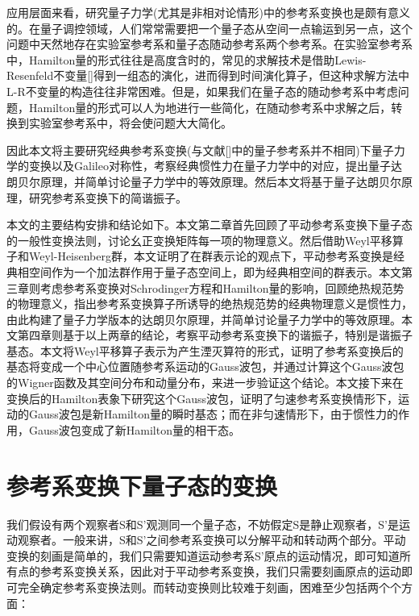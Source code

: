 \documentclass[a4paper]{article}
\begin{document}
        应用层面来看，研究量子力学(尤其是非相对论情形)中的参考系变换也是颇有意义的。在量子调控领域，人们常常需要把一个量子态从空间一点输运到另一点，这个问题中天然地存在实验室参考系和量子态随动参考系两个参考系。在实验室参考系中，Hamilton量的形式往往是高度含时的，常见的求解技术是借助Lewis-Resenfeld不变量[]得到一组态的演化，进而得到时间演化算子，但这种求解方法中L-R不变量的构造往往非常困难。但是，如果我们在量子态的随动参考系中考虑问题，Hamilton量的形式可以人为地进行一些简化，在随动参考系中求解之后，转换到实验室参考系中，将会使问题大大简化。

        因此本文将主要研究经典参考系变换(与文献[]中的量子参考系并不相同)下量子力学的变换以及Galileo对称性，考察经典惯性力在量子力学中的对应，提出量子达朗贝尔原理，并简单讨论量子力学中的等效原理。然后本文将基于量子达朗贝尔原理，研究参考系变换下的简谐振子。

        本文的主要结构安排和结论如下。本文第二章首先回顾了平动参考系变换下量子态的一般性变换法则，讨论幺正变换矩阵每一项的物理意义。然后借助Weyl平移算子和Weyl-Heisenberg群，本文证明了在群表示论的观点下，平动参考系变换是经典相空间作为一个加法群作用于量子态空间上，即为经典相空间的群表示。本文第三章则考虑参考系变换对Schrodinger方程和Hamilton量的影响，回顾绝热规范势的物理意义，指出参考系变换算子所诱导的绝热规范势的经典物理意义是惯性力，由此构建了量子力学版本的达朗贝尔原理，并简单讨论量子力学中的等效原理。本文第四章则基于以上两章的结论，考察平动参考系变换下的谐振子，特别是谐振子基态。本文将Weyl平移算子表示为产生湮灭算符的形式，证明了参考系变换后的基态将变成一个中心位置随参考系运动的Gauss波包，并通过计算这个Gauss波包的Wigner函数及其空间分布和动量分布，来进一步验证这个结论。本文接下来在变换后的Hamilton表象下研究这个Gauss波包，证明了匀速参考系变换情形下，运动的Gauss波包是新Hamilton量的瞬时基态；而在非匀速情形下，由于惯性力的作用，Gauss波包变成了新Hamilton量的相干态。



    \section{参考系变换下量子态的变换}

        我们假设有两个观察者S和S'观测同一个量子态，不妨假定S是静止观察者，S'是运动观察者。一般来讲，S和S'之间参考系变换可以分解平动和转动两个部分。平动变换的刻画是简单的，我们只需要知道运动参考系S'原点的运动情况，即可知道所有点的参考系变换关系，因此对于平动参考系变换，我们只需要刻画原点的运动即可完全确定参考系变换法则。而转动变换则比较难于刻画，困难至少包括两个个方面：
            
\end{document}
